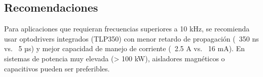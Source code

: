 \documentclass[12pt]{article}
\begin{document}
\subsection{Recomendaciones}

Para aplicaciones que requieran frecuencias superiores a 10 kHz, se recomienda usar optodrivers integrados (TLP350) con menor retardo de propagación (~350 ns vs. ~5 µs) y mejor capacidad de manejo de corriente (~2.5 A vs. ~16 mA). En sistemas de potencia muy elevada (> 100 kW), aisladores magnéticos o capacitivos pueden ser preferibles.
\end{document}
